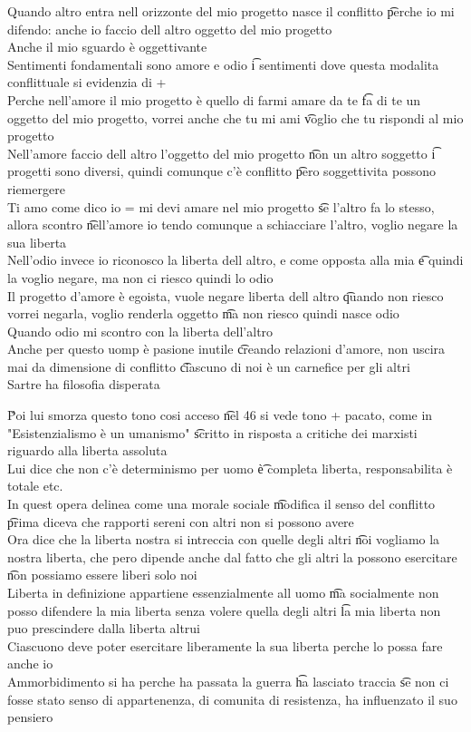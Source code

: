 \documentclass[12pt]{article}
\begin{document}
Quando altro entra nell orizzonte del mio progetto nasce il conflitto \t perche io mi difendo: anche io faccio dell altro oggetto del mio progetto \\
Anche il mio sguardo è oggettivante \\
Sentimenti fondamentali sono amore e odio \t i sentimenti dove questa modalita conflittuale si evidenzia di + \\
Perche nell'amore il mio progetto è quello di farmi amare da te \t fa di te un oggetto del mio progetto, vorrei anche che tu mi ami \t voglio che tu rispondi al mio progetto \\
Nell'amore faccio dell altro l'oggetto del mio progetto \t non un altro soggetto \t i progetti sono diversi, quindi comunque c'è conflitto \t pero soggettivita possono riemergere \\
Ti amo come dico io = mi devi amare nel mio progetto \t se l'altro fa lo stesso, allora scontro \t nell'amore io tendo comunque a schiacciare l'altro, voglio negare la sua liberta \\
Nell'odio invece io riconosco la liberta dell altro, e come opposta alla mia \t e quindi la voglio negare, ma non ci riesco quindi lo odio \\
Il progetto d'amore è egoista, vuole negare liberta dell altro \t quando non riesco vorrei negarla, voglio renderla oggetto \t ma non riesco quindi nasce odio \\
Quando odio mi scontro con la liberta dell'altro \\
Anche per questo uomp è pasione inutile \t creando relazioni d'amore, non uscira mai da dimensione di conflitto \t ciascuno di noi è un carnefice per gli altri \\
Sartre ha filosofia disperata

\v

Poi lui smorza questo tono cosi acceso \t nel 46 si vede tono + pacato, come in "Esistenzialismo è un umanismo" \t scritto in risposta a critiche dei marxisti riguardo alla liberta assoluta \\
Lui dice che non c'è determinismo per uomo \t è completa liberta, responsabilita è totale etc. \\
In quest opera delinea come una morale sociale \t modifica il senso del conflitto \t prima diceva che rapporti sereni con altri non si possono avere \\
Ora dice che la liberta nostra si intreccia con quelle degli altri \t noi vogliamo la nostra liberta, che pero dipende anche dal fatto che gli altri la possono esercitare \t non possiamo essere liberi solo noi \\
Liberta in definizione appartiene essenzialmente all uomo \t ma socialmente non posso difendere la mia liberta senza volere quella degli altri \t la mia liberta non puo prescindere dalla liberta altrui \\
Ciascuono deve poter esercitare liberamente la sua liberta perche lo possa fare anche io \\
Ammorbidimento si ha perche ha passata la guerra \t ha lasciato traccia \t se non ci fosse stato senso di appartenenza, di comunita di resistenza, ha influenzato il suo pensiero 
\end{document}

